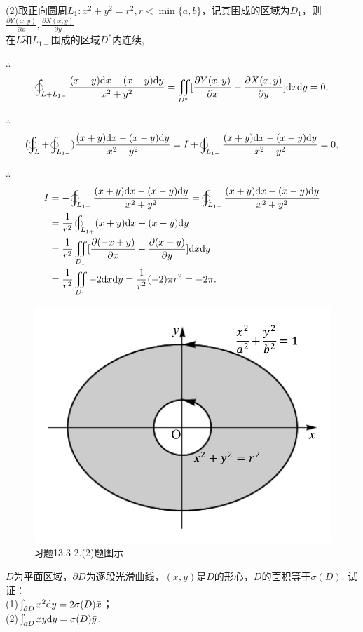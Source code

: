 \documentclass[12pt,UTF8]{ctexart}
\newcommand{\varIInt}[4]{\iint\limits_{#1}#2\mathrm d#3\mathrm d#4}
\newcommand{\BLInt}[2]{\varint\nolimits_{#1}#2}
\newcommand{\BLOInt}[2]{\varoint\nolimits_{#1}#2}
\newcommand{\md}[1]{\mathrm d#1}
\begin{document}
\begin{enumerate}
(2)取正向圆周$L_1:x^2+y^2=r^2,r<\min\{a,b\}$，记其围成的区域为$D_1$，则$\frac{\partial Y(x,y)}{\partial x},\frac{\partial X(x,y)}{\partial y}$\\
在$L$和$L_{1-}$围成的区域$D^*$内连续,

$\therefore$
\[\BLOInt{L+L_{1-}}{\frac{(x+y)\mathrm dx-(x-y)\mathrm dy}{x^2+y^2}}=\varIInt{D^*}{[\frac{\partial Y(x,y)}{\partial x}-\frac{\partial X(x,y)}{\partial y}]}xy=0,\]

$\therefore$
\[(\varoint\nolimits_L+\BLOInt{L_{1-}}{)\frac{(x+y)\mathrm dx-(x-y)\mathrm dy}{x^2+y^2}}=I+\BLOInt{L_{1-}}{\frac{(x+y)\mathrm dx-(x-y)\mathrm dy}{x^2+y^2}}=0,\]

$\therefore$
\[\begin{split}
I&=-\BLOInt{L_{1-}}{\frac{(x+y)\mathrm dx-(x-y)\mathrm dy}{x^2+y^2}}=\BLOInt{L_{1+}}{\frac{(x+y)\mathrm dx-(x-y)\mathrm dy}{x^2+y^2}}\\
&=\frac1{r^2}\BLOInt{L_{1+}}{(x+y)\mathrm dx-(x-y)\mathrm dy}\\
&=\frac1{r^2}\varIInt{D_1}{[\frac{\partial(-x+y)}{\partial x}-\frac{\partial(x+y)}{\partial y}]}xy\\
&=\frac1{r^2}\varIInt{D_1}{-2}xy=\frac1{r^2}(-2)\pi r^2=-2\pi.
\end{split}\]

\begin{figure}[H]
\begin{center}
\includegraphics[height=0.3\textheight]{Figures22/Fig13-3-2-2.pdf}
\end{center}
\caption{习题13.3 2.(2)题图示}
\label{13-3-2-2}
\end{figure}
$D$为平面区域，$\partial D$为逐段光滑曲线，$(\bar{x},\bar{y})$是$D$的形心，$D$的面积等于$\sigma(D)$. 试证：\\
(1)$\BLInt{\partial D}{x^2\md y}=2\sigma(D)\bar{x}$；\\
(2)$\BLInt{\partial D}{xy\md y}=\sigma(D)\bar{y}$.


\end{enumerate}
\end{document}
